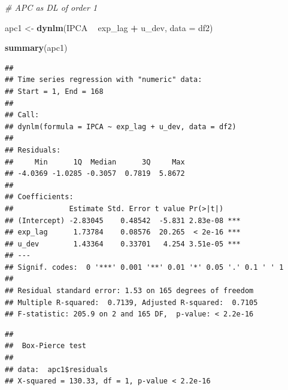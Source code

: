 \documentclass[
]{article}
\newenvironment{Shaded}{\begin{snugshade}}{\end{snugshade}}
\newcommand{\CommentTok}[1]{\textcolor[rgb]{0.56,0.35,0.01}{\textit{#1}}}
\newcommand{\DataTypeTok}[1]{\textcolor[rgb]{0.13,0.29,0.53}{#1}}
\newcommand{\DecValTok}[1]{\textcolor[rgb]{0.00,0.00,0.81}{#1}}
\newcommand{\KeywordTok}[1]{\textcolor[rgb]{0.13,0.29,0.53}{\textbf{#1}}}
\newcommand{\NormalTok}[1]{#1}
\newcommand{\OperatorTok}[1]{\textcolor[rgb]{0.81,0.36,0.00}{\textbf{#1}}}
\newcommand{\StringTok}[1]{\textcolor[rgb]{0.31,0.60,0.02}{#1}}
\begin{document}
\begin{Shaded}
\begin{Highlighting}[]
\CommentTok{# APC as DL of order 1}

\NormalTok{apc1 <-}\StringTok{ }\KeywordTok{dynlm}\NormalTok{(IPCA }\OperatorTok{~}\StringTok{ }\NormalTok{exp_lag }\OperatorTok{+}\StringTok{ }\NormalTok{u_dev, }\DataTypeTok{data =}\NormalTok{ df2)}

\KeywordTok{summary}\NormalTok{(apc1)}
\end{Highlighting}
\end{Shaded}

\begin{verbatim}
## 
## Time series regression with "numeric" data:
## Start = 1, End = 168
## 
## Call:
## dynlm(formula = IPCA ~ exp_lag + u_dev, data = df2)
## 
## Residuals:
##     Min      1Q  Median      3Q     Max 
## -4.0369 -1.0285 -0.3057  0.7819  5.8672 
## 
## Coefficients:
##             Estimate Std. Error t value Pr(>|t|)    
## (Intercept) -2.83045    0.48542  -5.831 2.83e-08 ***
## exp_lag      1.73784    0.08576  20.265  < 2e-16 ***
## u_dev        1.43364    0.33701   4.254 3.51e-05 ***
## ---
## Signif. codes:  0 '***' 0.001 '**' 0.01 '*' 0.05 '.' 0.1 ' ' 1
## 
## Residual standard error: 1.53 on 165 degrees of freedom
## Multiple R-squared:  0.7139, Adjusted R-squared:  0.7105 
## F-statistic: 205.9 on 2 and 165 DF,  p-value: < 2.2e-16
\end{verbatim}

\begin{Shaded}
\end{Shaded}

\begin{verbatim}
## 
##  Box-Pierce test
## 
## data:  apc1$residuals
## X-squared = 130.33, df = 1, p-value < 2.2e-16
\end{verbatim}

\begin{Shaded}
\end{Shaded}
\end{document}
